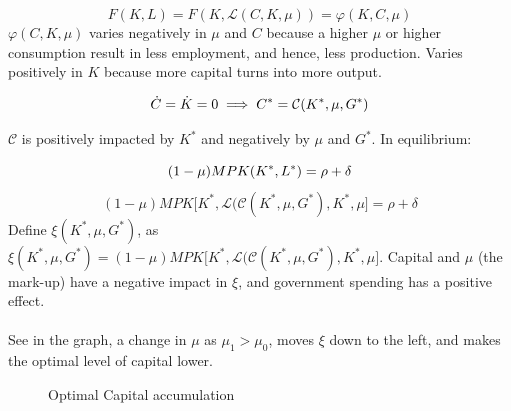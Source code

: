 \begin{equation*}
    F(K,L)=F(K,\mathcal{L}(C,K,\mu))=\varphi(K,C,\mu)
\end{equation*}
$\varphi(C,K,\mu)$ varies negatively in $\mu$ and $C$ because a higher $\mu$ or higher consumption result in less employment, and hence, less production. Varies positively in $K$ because more capital turns into more output. 

\begin{equation*}
\dot{C}=\dot{K}=0 \\
\implies C^{*}=\mathcal{C}(K^{*},\mu,G^{*})
\end{equation*}

$\mathcal{C}$ is positively impacted by $K^{*}$ and negatively by $\mu$ and $G^{*}$. 
In equilibrium:

\begin{equation*}
        (1-\mu)MPK(K^{*},L^{*})=\rho+\delta \\
\end{equation*}
\begin{equation*}
        (1-\mu)MPK \bigg[K^{*},\mathcal{L}(\mathcal{C}(K^{*},\mu,G^{*}),K^{*},\mu \bigg]=\rho+\delta
\end{equation*}
Define $\xi(K^{*}, \mu,G^{*})$, as $\xi(K^{*}, \mu,G^{*})= (1-\mu)MPK \bigg[K^{*},\mathcal{L}(\mathcal{C}(K^{*},\mu,G^{*}),K^{*},\mu \bigg]$. Capital and $\mu$ (the mark-up) have a negative impact in $\xi$, and government spending has a positive effect. 
\paragraph{}
See in the graph, a change in $\mu$ as $\mu_{1}>\mu_{0}$, moves $\xi$ down to the left, and makes the optimal level of capital lower.

\begin{figure}[H]
\centering
{}
\caption{Optimal Capital accumulation}

\end{figure}
